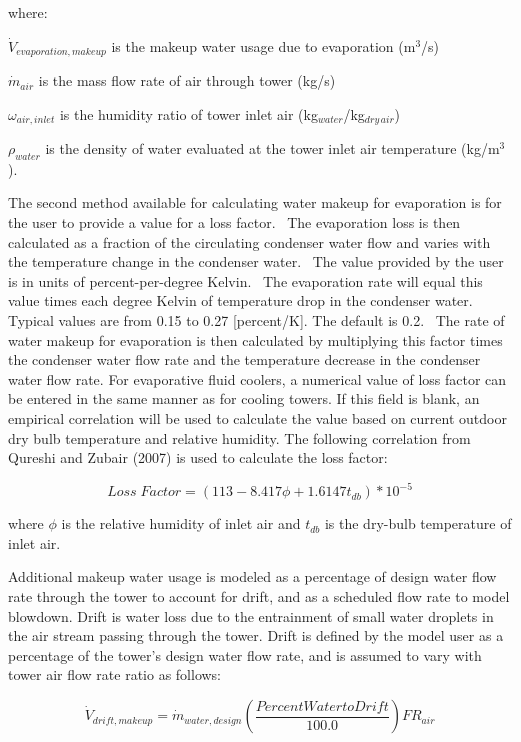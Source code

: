 where:

\({\dot V_{evaporation,makeup}}\) is the makeup water usage due to evaporation (m\(^{3}\)/s)

\({\dot m_{air}}\) is the mass flow rate of air through tower (kg/s)

\({\omega_{air,inlet}}\) is the humidity ratio of tower inlet air (kg\(_{water}\)/kg\(_{dry\, air}\))

\({\rho_{water}}\) is the density of water evaluated at the tower inlet air temperature (kg/m\(^{3}\)).

The second method available for calculating water makeup for evaporation is for the user to provide a value for a loss factor.~ The evaporation loss is then calculated as a fraction of the circulating condenser water flow and varies with the temperature change in the condenser water.~ The value provided by the user is in units of percent-per-degree Kelvin.~ The evaporation rate will equal this value times each degree Kelvin of temperature drop in the condenser water.~ Typical values are from 0.15 to 0.27 {[}percent/K{]}. The default is 0.2.~ The rate of water makeup for evaporation is then calculated by multiplying this factor times the condenser water flow rate and the temperature decrease in the condenser water flow rate. For evaporative fluid coolers, a numerical value of loss factor can be entered in the same manner as for cooling towers. If this field is blank, an empirical correlation will be used to calculate the value based on current outdoor dry bulb temperature and relative humidity. The following correlation from Qureshi and Zubair (2007) is used to calculate the loss factor:

\begin{equation}
Loss\;Factor = (113 - 8.417\phi  + 1.6147{t_{db}})*{10^{ - 5}}
\end{equation}

where \(\phi\) is the relative humidity of inlet air and \({t_{db}}\) is the dry-bulb temperature of inlet air.

Additional makeup water usage is modeled as a percentage of design water flow rate through the tower to account for drift, and as a scheduled flow rate to model blowdown. Drift is water loss due to the entrainment of small water droplets in the air stream passing through the tower. Drift is defined by the model user as a percentage of the tower's design water flow rate, and is assumed to vary with tower air flow rate ratio as follows:

\begin{equation}
{\dot V_{drift,makeup}} = {\dot m_{water,design}}\left( {\frac{{PercentWatertoDrift}}{{100.0}}} \right)F{R_{air}}
\end{equation}

